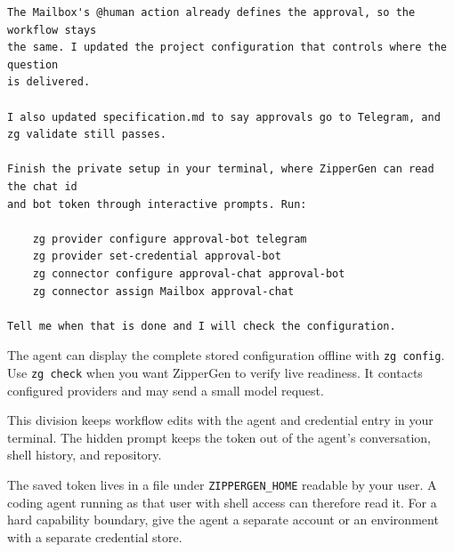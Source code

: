 \documentclass[11pt,a4paper]{article}
\begin{document}
\begin{lstlisting}[style=agent]
The Mailbox's @human action already defines the approval, so the workflow stays
the same. I updated the project configuration that controls where the question
is delivered.

I also updated specification.md to say approvals go to Telegram, and
zg validate still passes.

Finish the private setup in your terminal, where ZipperGen can read the chat id
and bot token through interactive prompts. Run:

    zg provider configure approval-bot telegram
    zg provider set-credential approval-bot
    zg connector configure approval-chat approval-bot
    zg connector assign Mailbox approval-chat

Tell me when that is done and I will check the configuration.
\end{lstlisting}

The agent can display the complete stored configuration offline with
\texttt{zg config}. Use \texttt{zg check} when you want ZipperGen to verify
live readiness. It contacts configured providers and may send a small model
request.

This division keeps workflow edits with the agent and credential entry in your
terminal. The hidden prompt keeps the token out of the agent's conversation,
shell history, and repository.

The saved token lives in a file under \texttt{ZIPPERGEN\_HOME} readable by your
user. A coding agent running as that user with shell access can therefore read
it. For a hard capability boundary, give the agent a separate account or an
environment with a separate credential store.
\end{document}

